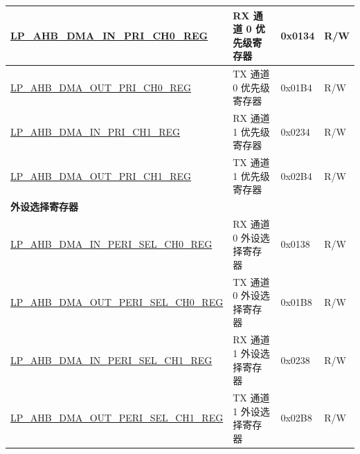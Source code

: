 \begin{longtable}{ | l | l | p{1.3cm} | l | }
\hyperref[regdesc:LPAHBDMAINPRICHNREG]{LP\_AHB\_DMA\_IN\_PRI\_CH0\_REG} & RX 通道 0 优先级寄存器 & 0x0134 & R/W \\ \hline
\hyperref[regdesc:LPAHBDMAOUTPRICHNREG]{LP\_AHB\_DMA\_OUT\_PRI\_CH0\_REG} & TX 通道 0 优先级寄存器 & 0x01B4 & R/W \\ \hline
\hyperref[regdesc:LPAHBDMAINPRICHNREG]{LP\_AHB\_DMA\_IN\_PRI\_CH1\_REG} & RX 通道 1 优先级寄存器 & 0x0234 & R/W \\ \hline
\hyperref[regdesc:LPAHBDMAOUTPRICHNREG]{LP\_AHB\_DMA\_OUT\_PRI\_CH1\_REG} & TX 通道 1 优先级寄存器 & 0x02B4 & R/W \\ \hline
\multicolumn{4}{|l|}{\textbf{外设选择寄存器}} \\ \hline
\hyperref[regdesc:LPAHBDMAINPERISELCHNREG]{LP\_AHB\_DMA\_IN\_PERI\_SEL\_CH0\_REG} & RX 通道 0 外设选择寄存器 & 0x0138 & R/W \\ \hline
\hyperref[regdesc:LPAHBDMAOUTPERISELCHNREG]{LP\_AHB\_DMA\_OUT\_PERI\_SEL\_CH0\_REG} & TX 通道 0 外设选择寄存器 & 0x01B8 & R/W \\ \hline
\hyperref[regdesc:LPAHBDMAINPERISELCHNREG]{LP\_AHB\_DMA\_IN\_PERI\_SEL\_CH1\_REG} & RX 通道 1 外设选择寄存器 & 0x0238 & R/W \\ \hline
\hyperref[regdesc:LPAHBDMAOUTPERISELCHNREG]{LP\_AHB\_DMA\_OUT\_PERI\_SEL\_CH1\_REG} & TX 通道 1 外设选择寄存器 & 0x02B8 & R/W \\ \hline
\end{longtable}

